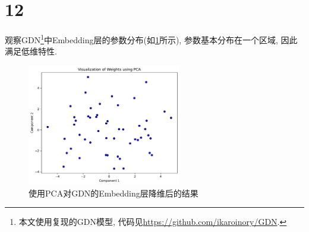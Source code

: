 \section*{12}

观察GDN\cite{deng2021graph}\footnote{本文使用复现的GDN模型, 代码见\href{https://github.com/ikaroinory/GDN}{https://github.com/ikaroinory/GDN}.}中Embedding层的参数分布(如\cref{figure:12}所示), 参数基本分布在一个区域, 因此满足低维特性.

\begin{figure}[ht]
    \centering
    \includegraphics[width=0.6\textwidth]{figures/1.pdf}
    \caption{使用PCA对GDN的Embedding层降维后的结果}
    \label{figure:12}
\end{figure}
